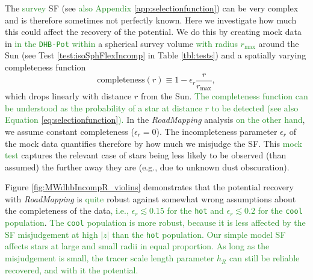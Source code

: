\documentclass[iop,revtex4]{emulateapj}
\newcommand{\RM}{{\sl RoadMapping}}
\newcommand{\NEW}[1]{\textcolor{ForestGreen}{#1}}
\newcommand{\OLD}[1]{}
\begin{document}
The \NEW{survey} SF (see \OLD{Section}\NEW{also Appendix} \ref{app:selectionfunction}) can be very complex and is therefore sometimes not perfectly known. Here we investigate how much this could affect the recovery of the potential. We do this by creating mock data in \NEW{in the \texttt{DHB-Pot} within} a spherical survey volume \NEW{with radius $r_\text{max}$} around the Sun (see Test \ref{test:isoSphFlexIncomp} in Table \ref{tbl:tests}) and a spatially varying completeness function
\begin{equation}
\text{completeness}(r) \equiv 1- \epsilon_r \frac{r}{r_\text{max}}, \label{eq:rad_incomp}
\end{equation}
which drops linearly with distance $r$ from the Sun. \NEW{The completeness function can be understood as the probability of a star at distance $r$ to be detected (see also  Equation \ref{eq:selectionfunction}).} In the \RM{} analysis \OLD{however}\NEW{on the other hand}, we assume constant completeness ($\epsilon_r=0$). The incompleteness parameter $\epsilon_r$ of the mock data quantifies therefore by how much we misjudge the SF. This \NEW{mock test} captures the relevant case of stars being less likely to be observed (than assumed) the further away they are (e.g., due to unknown dust obscuration). 

Figure \ref{fig:MWdhbIncompR_violins} demonstrates that the potential recovery with \RM{} is \OLD{very}\NEW{quite} robust against somewhat wrong assumptions about the completeness of the data\NEW{, i.e., $\epsilon_r \lesssim 0.15$ for the \texttt{hot} and $\epsilon_r \lesssim 0.2$ for the \texttt{cool} population}. \NEW{The \texttt{cool} population is more robust, because it is less affected by the SF misjudgement at high $|z|$ than the \texttt{hot} population. Our simple model SF affects stars at large and small radii in equal proportion. As long as the misjudgement is small, the tracer scale length parameter $h_R$ can still be reliable recovered, and with it the potential.} \OLD{The robustness for the \texttt{cool} stellar population is even more striking than for the \texttt{hot} population. The reason for this robustness could be, that much information about the potential comes from the rotation curve measurements in the plane, which is not affected by the incompleteness of the sample. We test this by analysing the data sets from Figure \ref{fig:isoSphFlexIncompR_violins} again, but this time not including tangential velocity measurements (which is done by marginalizing the likelihood in Equation \eqref{eq:prob} over $v_T$). Figure \ref{fig:isoSphFlexIncompR_marginal_violins} shows that in this case the potential is much less tightly constrained, even for 20,000 stars. For only minor deviations of true and assumed completeness ($\epsilon_r \lesssim 0.15$) the true potential is however still included within the errors of our fitting result (see Figure \ref{fig:isoSphFlexIncompR_marginal_violins}).}
\end{document}
